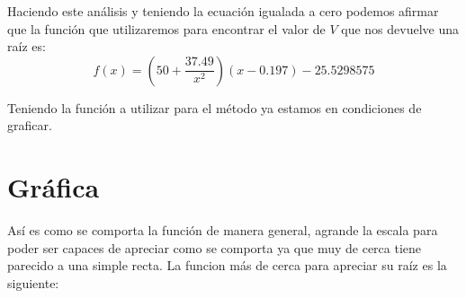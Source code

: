 \documentclass{article}
\begin{document}
Haciendo este análisis y teniendo la ecuación igualada a cero podemos afirmar que la función que utilizaremos para encontrar el valor de $V$ que nos devuelve una raíz es:
$$f(x) = (50+\frac{37.49}{x^2})(x-0.197)-25.5298575$$


Teniendo la función a utilizar para el método ya estamos en condiciones de graficar.

\section{Gráfica}
 \begin{figure}[h]
    \centering
    
 \end{figure}

Así es como se comporta la función de manera general, agrande la escala para poder ser capaces de apreciar como se comporta ya que muy de cerca tiene parecido a una simple recta. 
La funcion más de cerca para apreciar su raíz es la siguiente:
        
\begin{figure}[h]
    \centering
\end{figure}
\end{document}
